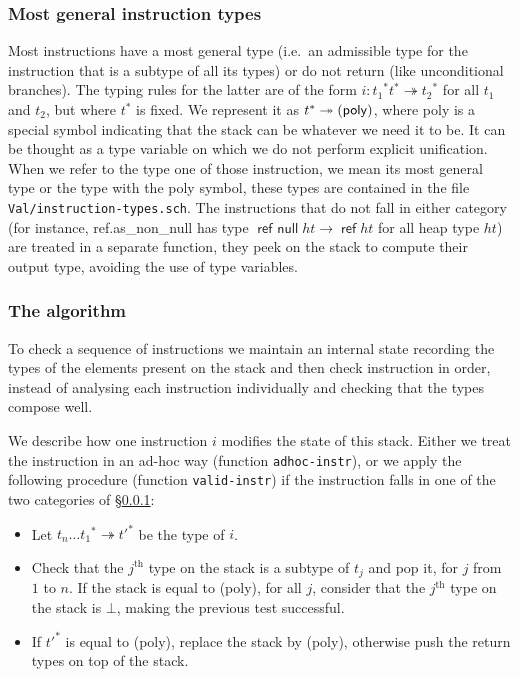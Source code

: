 \documentclass[a4paper,11pt]{article}
\DeclareMathOperator{\reft}{\textsf{ref}}
\DeclareMathOperator{\refnullt}{\textsf{ref null}}
\begin{document}
\subsubsection{Most general instruction types}\label{mgt}
Most instructions have a most general type (i.e.\ an admissible type for the
instruction that is a subtype of all its types) or do not return (like
unconditional branches). The typing rules for the latter are of the form
$i:{t_1}^*t^*\twoheadrightarrow {t_2}^*$ for all $t_1$ and $t_2$, but where
$t^*$ is fixed. We represent it as $t^*\twoheadrightarrow
(\text{\textsf{poly}})$, where \textsf{poly} is a special symbol indicating that
the stack can be whatever we need it to be. It can be thought as a type variable
on which we do not perform explicit unification. When we refer to the type one
of those instruction, we mean its most general type or the type with the
\textsf{poly} symbol, these types are contained in the file
\texttt{Val/instruction-types.sch}. The instructions that do not fall in either
category (for instance, \textsf{ref.as\_non\_null} has type $\refnullt ht\to
\reft ht$ for all heap type $ht$) are treated in a separate function, they peek
on the stack to compute their output type, avoiding the use of type variables.

\subsubsection{The algorithm}
To check a sequence of instructions we maintain an internal state recording the
types of the elements present on the stack and then check instruction in order,
instead of analysing each instruction individually and checking that the types
compose well.

We describe how one instruction $i$ modifies the state of this stack. Either we
treat the instruction in an ad-hoc way (function \texttt{adhoc-instr}), or we
apply the following procedure (function \texttt{valid-instr}) if the instruction
falls in one of the two categories of \S\ref{mgt}:
\begin{itemize}\setlength{\itemsep}{0pt}
\item Let ${t_n\ldots t_1}^*\twoheadrightarrow{t'}^*$ be the type of $i$.
\item Check that the $j^{\text{th}}$ type on the stack is a subtype of $t_j$ and
  pop it, for $j$ from $1$ to $n$. If the stack is equal to \textsf{(poly)}, for
  all $j$, consider that the $j^{\text{th}}$ type on the stack is $\bot$, making
  the previous test successful.
\item If ${t'}^*$ is equal to \textsf{(poly)}, replace the stack by
  \textsf{(poly)}, otherwise push the return types on top of the stack.
\end{itemize}
\end{document}
